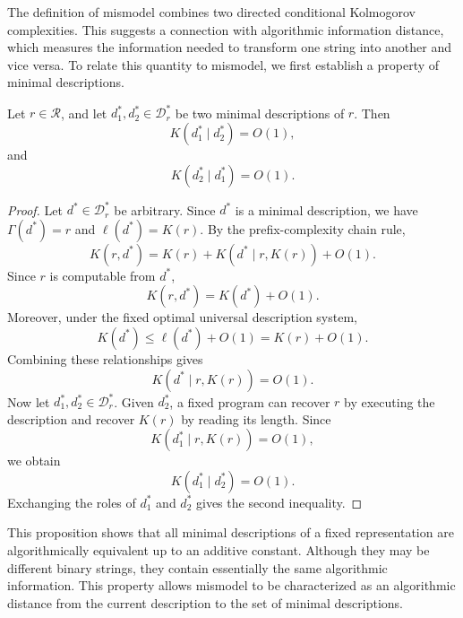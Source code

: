 The definition of mismodel combines two directed conditional Kolmogorov complexities. This suggests a connection with algorithmic information distance, which measures the information needed to transform one string into another and vice versa. To relate this quantity to mismodel, we first establish a property of minimal descriptions.

\begin{proposition}
\label{prop:minimal_descriptions_mutually_recoverable}
Let $r\in\mathcal R$, and let $d_1^\ast,d_2^\ast\in\mathcal D_r^\ast$ be two minimal descriptions of $r$. Then
\[
K(d_1^\ast\mid d_2^\ast)=O(1),
\]
and
\[
K(d_2^\ast\mid d_1^\ast)=O(1).
\]
\end{proposition}
\begin{proof}
Let $d^\ast\in\mathcal D_r^\ast$ be arbitrary. Since $d^\ast$ is a minimal description, we have $\Gamma(d^\ast)=r$ and $\ell(d^\ast)=K(r)$. By the prefix-complexity chain rule,
\[
K(r,d^\ast) = K(r)+K(d^\ast\mid r,K(r))+O(1).
\]
Since $r$ is computable from $d^\ast$,
\[
K(r,d^\ast)=K(d^\ast)+O(1).
\]
Moreover, under the fixed optimal universal description system,
\[
K(d^\ast)\le\ell(d^\ast)+O(1)
=
K(r)+O(1).
\]
Combining these relationships gives
\[
K(d^\ast\mid r,K(r))=O(1).
\]
Now let $d_1^\ast,d_2^\ast\in\mathcal D_r^\ast$. Given $d_2^\ast$, a fixed program can recover $r$ by executing the description and recover $K(r)$ by reading its length. Since
\[
K(d_1^\ast\mid r,K(r))=O(1),
\]
we obtain
\[
K(d_1^\ast\mid d_2^\ast)=O(1).
\]
Exchanging the roles of $d_1^\ast$ and $d_2^\ast$ gives the second inequality.
\end{proof}

This proposition shows that all minimal descriptions of a fixed representation are algorithmically equivalent up to an additive constant. Although they may be different binary strings, they contain essentially the same algorithmic information. This property allows mismodel to be characterized as an algorithmic distance from the current description to the set of minimal descriptions.

